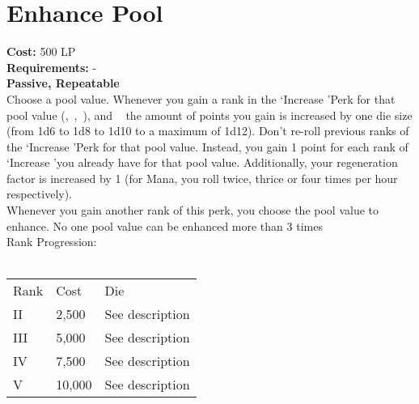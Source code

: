\section{Enhance Pool}\label{sec:enhancepool}
\textbf{Cost:} 500 LP\\
\textbf{Requirements:} -\\
\textbf{Passive, Repeatable}\\
Choose a pool value.
Whenever you gain a rank in the \lq Increase \rq Perk for that pool value (,~,~), and ~ the amount of points you gain is increased by one die size (from 1d6 to 1d8 to 1d10 to a maximum of 1d12).
Don't re-roll previous ranks of the \lq Increase \rq Perk for that pool value.
Instead, you gain 1 point for each rank of \lq Increase \rq you already have for that pool value.
Additionally, your regeneration factor is increased by 1 (for Mana, you roll twice, thrice or four times per hour respectively).\\
Whenever you gain another rank of this perk, you choose the pool value to enhance.
No one pool value can be enhanced more than 3 times
\\
Rank Progression:\\
\\
\begin{tabular}{l | l | p{12cm} }
    Rank & Cost & Die\\
    II & 2,500 & See description \\
    III & 5,000 & See description \\
    IV & 7,500 & See description\\
    V & 10,000 & See description\\
\end{tabular}